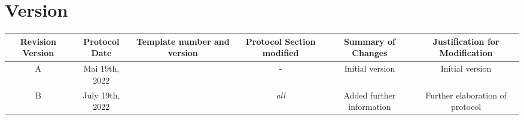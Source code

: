 \section{Version}
\begin{tabularx}{1\textwidth}{@{}C *{5}{C}@{}}
\toprule
\textbf{Revision Version} & \textbf{Protocol Date} & \textbf{Template number and version} & \textbf{Protocol Section modified} & \textbf{Summary of Changes} & \textbf{Justification for Modification}\\
\midrule
A & Mai 19th, 2022 &  & - & Initial version & Initial version \\
B & July 19th, 2022 &  & \textit{all} & Added further information & Further elaboration of protocol\\
\bottomrule
\end{tabularx}


